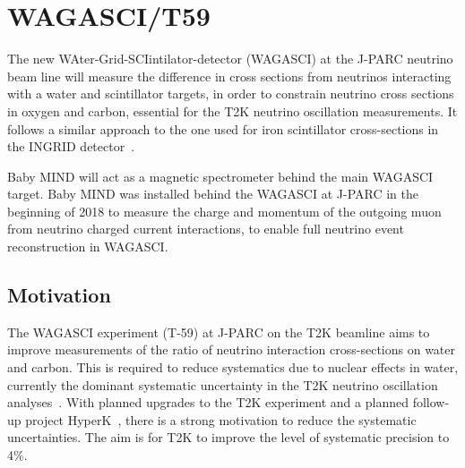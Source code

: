 

\section{WAGASCI/T59}\label{sec:WAGASCI}

The new WAter-Grid-SCIintilator-detector (WAGASCI) at the J-PARC neutrino beam line will measure the difference in cross sections from neutrinos interacting with a water and scintillator targets, in order to constrain neutrino cross sections in oxygen and carbon, essential for the T2K neutrino oscillation measurements. It follows a similar approach to the one used for iron scintillator cross-sections in the INGRID detector~\cite{21T2K}.

Baby MIND will act as a magnetic spectrometer behind the main WAGASCI target. Baby MIND was installed behind the WAGASCI at J-PARC in the beginning of 2018 to measure the charge and momentum of the outgoing muon from neutrino charged current interactions, to enable full neutrino event reconstruction in WAGASCI.

\subsection{Motivation}
The WAGASCI experiment (T-59) at J-PARC on the T2K beamline aims to improve measurements of the ratio of neutrino interaction cross-sections on water and carbon. This is required to reduce systematics due to nuclear effects in water, currently the dominant systematic uncertainty in the T2K neutrino oscillation analyses~\cite{21T2K}. With planned upgrades to the T2K experiment and a planned follow-up project HyperK~\cite{24HyperK}, there is a strong motivation to reduce the systematic uncertainties. The aim is for T2K to improve the level of systematic precision to 4\%. 



